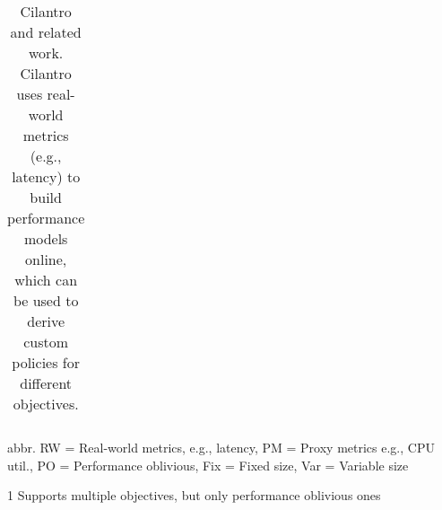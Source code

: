 {\begin{table*}[ht]
\begin{threeparttable}
\begin{tabular}{p{1 cm}ccccccccccccc}
\end{tabular}
\begin{tablenotes}[flushleft]\footnotesize
\item abbr. RW = Real-world metrics, e.g., latency, PM = Proxy metrics e.g., CPU util., PO = Performance oblivious, Fix = Fixed size, Var = Variable size
\item [1] Supports multiple objectives, but only performance oblivious ones
\end{tablenotes}
\vspace{0.5em}
\vspace{-0.05in}
\caption{\small Cilantro and related work. Cilantro uses real-world metrics (e.g., latency) to build performance models online, which can be used to derive custom policies for different objectives.}
\vspace{-1em}
\label{tab:relatedwork}
\end{threeparttable}
\end{table*}
}
